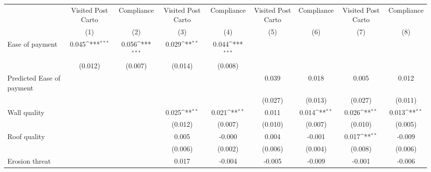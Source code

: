 {
\def\sym#1{\ifmmode^{#1}\else\(^{#1}\)\fi}
\begin{tabular}{l*{8}{c}}
\toprule
                &\multicolumn{1}{c}{Visited Post Carto}&\multicolumn{1}{c}{Compliance}&\multicolumn{1}{c}{Visited Post Carto}&\multicolumn{1}{c}{Compliance}&\multicolumn{1}{c}{Visited Post Carto}&\multicolumn{1}{c}{Compliance}&\multicolumn{1}{c}{Visited Post Carto}&\multicolumn{1}{c}{Compliance}\\
                &\multicolumn{1}{c}{(1)}         &\multicolumn{1}{c}{(2)}         &\multicolumn{1}{c}{(3)}         &\multicolumn{1}{c}{(4)}         &\multicolumn{1}{c}{(5)}         &\multicolumn{1}{c}{(6)}         &\multicolumn{1}{c}{(7)}         &\multicolumn{1}{c}{(8)}         \\
\midrule
Ease of payment &    0.045\sym{***}&    0.056\sym{***}&    0.029\sym{**} &    0.044\sym{***}&                  &                  &                  &                  \\
                &  (0.012)         &  (0.007)         &  (0.014)         &  (0.008)         &                  &                  &                  &                  \\
Predicted Ease of payment&                  &                  &                  &                  &    0.039         &    0.018         &    0.005         &    0.012         \\
                &                  &                  &                  &                  &  (0.027)         &  (0.013)         &  (0.027)         &  (0.011)         \\
Wall quality    &                  &                  &    0.025\sym{**} &    0.021\sym{**} &    0.011         &    0.014\sym{**} &    0.026\sym{**} &    0.013\sym{**} \\
                &                  &                  &  (0.012)         &  (0.007)         &  (0.010)         &  (0.007)         &  (0.010)         &  (0.005)         \\
Roof quality    &                  &                  &    0.005         &   -0.000         &    0.004         &   -0.001         &    0.017\sym{**} &   -0.009         \\
                &                  &                  &  (0.006)         &  (0.002)         &  (0.006)         &  (0.004)         &  (0.008)         &  (0.006)         \\
Erosion threat  &                  &                  &    0.017         &   -0.004         &   -0.005         &   -0.009         &   -0.001         &   -0.006         \\

\end{tabular}}
